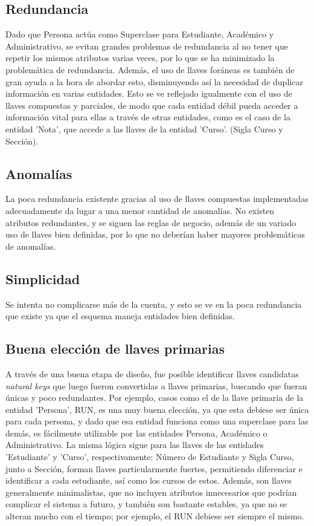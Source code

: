 \documentclass[12pt]{article}
\begin{document}
\subsection*{Redundancia}
Dado que Persona actúa como Superclase para Estudiante, Académico y Administrativo, se evitan grandes problemas de redundancia al no tener que repetir los mismos atributos varias veces, por lo que se ha minimizado la problemática de redundancia. Además, el uso de llaves foráneas es también de gran ayuda a la hora de abordar esto, disminuyendo así la necesidad de duplicar información en varias entidades. Esto se ve reflejado igualmente con el uso de llaves compuestas y parciales, de modo que cada entidad débil pueda acceder a información vital para ellas a través de otras entidades, como es el caso de la entidad 'Nota', que accede a las llaves de la entidad 'Curso'. (Sigla Curso y Sección).
\subsection*{Anomalías}
La poca redundancia existente gracias al uso de llaves compuestas implementadas adecuadamente da lugar a una menor cantidad de anomalías. No existen atributos redundantes, y se siguen las reglas de negocio, además de un variado uso de llaves bien definidas, por lo que no deberían haber mayores problemáticas de anomalías. 
\subsection*{Simplicidad}
Se intenta no complicarse más de la cuenta, y esto se ve en la poca redundancia que existe ya que el esquema maneja entidades bien definidas. 
\subsection*{Buena elección de llaves primarias}
A través de una buena etapa de diseño, fue posible identificar llaves candidatas \textit{natural keys} que luego fueron convertidas a llaves primarias, buscando que fueran únicas y poco redundantes. Por ejemplo, casos como el de la llave primaria de la entidad
'Persona', RUN, es una muy buena elección, ya que esta debiese ser única para cada persona, y dado que esa entidad funciona como una superclase para las demás, es fácilmente utilizable por las entidades Persona, Académico o Administrativo. La misma lógica sigue para las llaves de las entidades 
'Estudiante' y 'Curso', respectivamente: Número de Estudiante y Sigla Curso, junto a Sección, forman llaves particularmente fuertes, permitiendo diferenciar e identificar a cada estudiante, así como los cursos de estos. Además, son llaves generalmente minimalistas, que no incluyen atributos innecesarios que podrían complicar el sistema a futuro, y también son bastante estables, ya que no se alteran mucho con el tiempo; por ejemplo, el RUN debiese ser siempre el mismo.





\end{document}
